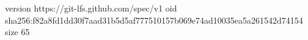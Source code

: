 version https://git-lfs.github.com/spec/v1
oid sha256:f82a8fd1dd30f7aad31b5d5af777510157b069e74ad10035ea5a261542d74154
size 65
